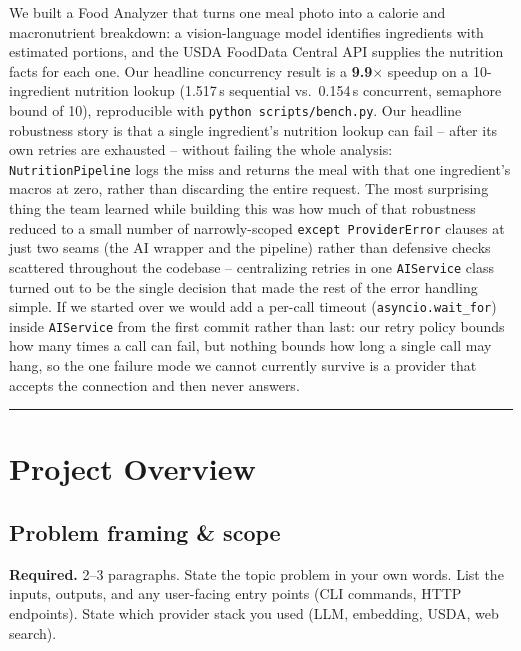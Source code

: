 \documentclass[11pt,a4paper]{article}
\newenvironment{deliverbox}{\begin{deliverboxshown}}{\end{deliverboxshown}}
\newenvironment{deliverbox}{\setbox0\vbox\bgroup}{\egroup\ignorespacesafterend}
\begin{document}
\par\noindent
We built a Food Analyzer that turns one meal photo into a calorie and
macronutrient breakdown: a vision-language model identifies ingredients with
estimated portions, and the USDA FoodData Central API supplies the nutrition
facts for each one. Our headline concurrency result is a \textbf{9.9$\times$}
speedup on a 10-ingredient nutrition lookup (1.517\,s sequential vs.\
0.154\,s concurrent, semaphore bound of 10), reproducible with
\texttt{python scripts/bench.py}. Our headline robustness story is that a
single ingredient's nutrition lookup can fail -- after its own retries are
exhausted -- without failing the whole analysis: \texttt{NutritionPipeline}
logs the miss and returns the meal with that one ingredient's macros at zero,
rather than discarding the entire request. The most surprising thing the
team learned while building this was how much of that robustness reduced to
a small number of narrowly-scoped \texttt{except ProviderError} clauses at
just two seams (the AI wrapper and the pipeline) rather than defensive
checks scattered throughout the codebase -- centralizing retries in one
\texttt{AIService} class turned out to be the single decision that made the
rest of the error handling simple. If we started over we would add a
per-call timeout (\texttt{asyncio.wait\_for}) inside \texttt{AIService}
from the first commit rather than last: our retry policy bounds how many
times a call can fail, but nothing bounds how long a single call may hang,
so the one failure mode we cannot currently survive is a provider that
accepts the connection and then never answers.

\tableofcontents
\vspace{0.6em}\hrule\vspace{0.4em}

\section{Project Overview}

\subsection{Problem framing \& scope}

\begin{deliverbox}
\textbf{Required.} 2--3 paragraphs. State the topic problem in your own words. List the inputs, outputs, and any user-facing entry points (CLI commands, HTTP endpoints). State which provider stack you used (LLM, embedding, USDA, web search).
\end{deliverbox}
\end{document}
